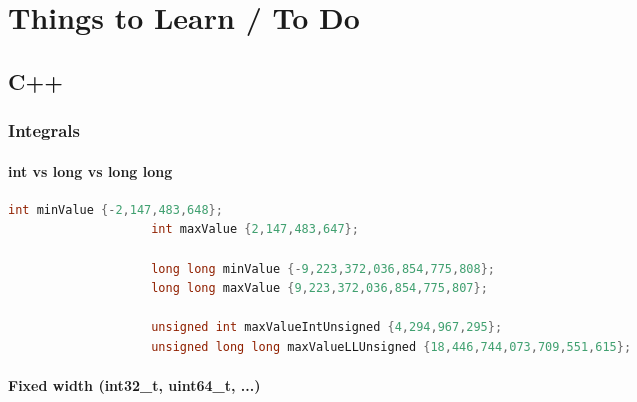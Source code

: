 \documentclass[11pt, fleqn]{report}                             %
\theoremstyle{break}                                            %
\begin{document}
\restoregeometry                                                    %
\nopagecolor                                                        %


\begin{multicols}{2}

{\let\onecolumn\relax\tableofcontents}
\label{sec:Index}

\clearpage


\part{Things to Learn / To Do}
    
    \chapter{C++}

        \section{Integrals}
        
            \subsection{int vs long vs long long}

                \begin{lstlisting}[language=C++, gobble=20]
                    int minValue {-2,147,483,648};
                    int maxValue {2,147,483,647};

                    long long minValue {-9,223,372,036,854,775,808};
                    long long maxValue {9,223,372,036,854,775,807};

                    unsigned int maxValueIntUnsigned {4,294,967,295};
                    unsigned long long maxValueLLUnsigned {18,446,744,073,709,551,615};
                \end{lstlisting}

            \subsection{Fixed width (int32\_t, uint64\_t, ...)}


\end{multicols}
\end{document}
